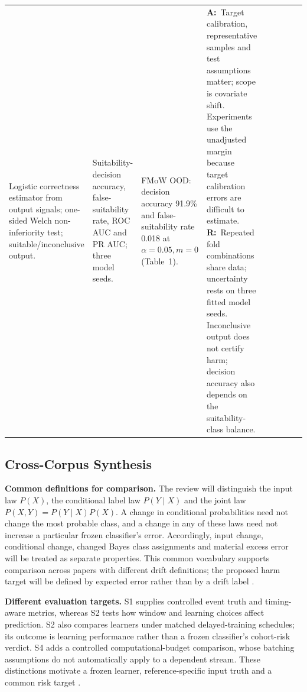 \documentclass[11pt,a4paper]{article}
\newcommand{\A}{\textbf{A:}\ }
\newcommand{\R}{\textbf{R:}\ }
\begin{document}
\begin{landscape}
\begin{longtable}{L{0.65cm}L{4.0cm}L{0.85cm}L{2.9cm}L{2.8cm}L{2.8cm}L{2.4cm}L{3.0cm}L{4.2cm}}
Logistic correctness estimator from output signals; one-sided Welch non-inferiority test; suitable/inconclusive output. &
Suitability-decision accuracy, false-suitability rate, ROC AUC and PR AUC; three model seeds. &
FMoW OOD: decision accuracy 91.9\% and false-suitability rate 0.018 at $\alpha=0.05,m=0$ (Table~1). &
\A Target calibration, representative samples and test assumptions matter; scope is covariate shift. Experiments use the unadjusted margin because target calibration errors are difficult to estimate.
\R Repeated fold combinations share data; uncertainty rests on three fitted model seeds. Inconclusive output does not certify harm; decision accuracy also depends on the suitability-class balance.\\
\end{longtable}
\endgroup
\end{landscape}

\subsection*{Cross-Corpus Synthesis}
\textbf{Common definitions for comparison.} The review will distinguish the
input law $P(X)$, the conditional label law $P(Y\mid X)$ and the joint law
$P(X,Y)=P(Y\mid X)P(X)$. A change in conditional probabilities need not
change the most probable class, and a change in any of these laws need not
increase a particular frozen classifier's error. Accordingly, input change,
conditional change, changed Bayes class assignments and material excess error
will be treated as separate properties. This common vocabulary supports
comparison across papers with different drift definitions; the proposed harm
target will be defined by expected error rather than by a drift label
\cite{window,batched,pprm,suitability}.

\textbf{Different evaluation targets.} S1 supplies controlled event truth and
timing-aware metrics, whereas S2 tests how window and learning choices affect
prediction. S2 also compares learners under matched delayed-training schedules;
its outcome is learning performance rather than a frozen classifier's
cohort-risk verdict. S4 adds a controlled computational-budget comparison, whose batching
assumptions do not automatically apply to a dependent stream. These distinctions
motivate a frozen learner, reference-specific input truth and a common risk
target \cite{cerqueira,window,batched}.
\end{document}
